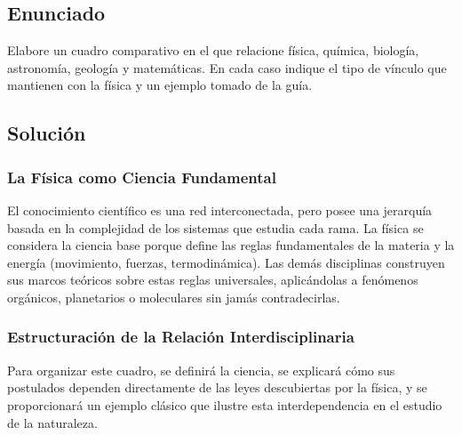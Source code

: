 \documentclass[12pt, a4paper]{article}
\begin{document}
\newpage

\subsection*{Enunciado}
Elabore un cuadro comparativo en el que relacione física, química, biología, astronomía, geología y matemáticas. En cada caso indique el tipo de vínculo que mantienen con la física y un ejemplo tomado de la guía.

\subsection*{Solución}

\subsubsection*{La Física como Ciencia Fundamental}
El conocimiento científico es una red interconectada, pero posee una jerarquía basada en la complejidad de los sistemas que estudia cada rama. La física se considera la ciencia base porque define las reglas fundamentales de la materia y la energía (movimiento, fuerzas, termodinámica). Las demás disciplinas construyen sus marcos teóricos sobre estas reglas universales, aplicándolas a fenómenos orgánicos, planetarios o moleculares sin jamás contradecirlas.

\subsubsection*{Estructuración de la Relación Interdisciplinaria}
Para organizar este cuadro, se definirá la ciencia, se explicará cómo sus postulados dependen directamente de las leyes descubiertas por la física, y se proporcionará un ejemplo clásico que ilustre esta interdependencia en el estudio de la naturaleza.
\end{document}
